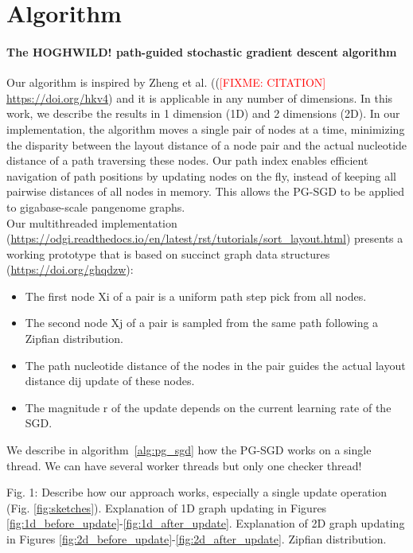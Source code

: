 \documentclass{bioinfo}
\theoremstyle{definition}
\newcommand{\red}[1]{{\textcolor{Red}{#1}}}
\newcommand{\FIXME}[1]{\red{[FIXME: #1]}}
\begin{document}
    \section{Algorithm}

    \paragraph{The HOGHWILD! path-guided stochastic gradient descent algorithm}
    Our algorithm is inspired by Zheng et al. ((\FIXME{CITATION} \url{https://doi.org/hkv4}) and it is applicable in any number of dimensions.
    In this work, we describe the results in 1 dimension (1D) and 2 dimensions (2D).
    In our implementation, the algorithm moves a single pair of nodes at a time, minimizing the disparity between the layout distance of a node pair and the actual nucleotide distance of a path traversing these nodes.
    Our path index enables efficient navigation of path positions by updating nodes on the fly, instead of keeping all pairwise distances of all nodes in memory.
    This allows the PG-SGD to be applied to gigabase-scale pangenome graphs. \\
    Our multithreaded implementation (\url{https://odgi.readthedocs.io/en/latest/rst/tutorials/sort_layout.html}) presents a working prototype that is based on succinct graph data structures (\url{https://doi.org/ghqdzw}):
    \begin{itemize}
        \item The first node Xi of a pair is a uniform path step pick from all nodes.
        \item The second node Xj of a pair is sampled from the same path following a Zipfian distribution.
        \item The path nucleotide distance of the nodes in the pair guides the actual layout distance dij update of these nodes.
        \item The magnitude r of the update depends on the current learning rate of the SGD.
    \end{itemize}
    We describe in algorithm~\ref{alg:pg_sgd} how the PG-SGD works on a single thread.
    We can have several worker threads but only one checker thread!

    

    \iffalse
    Fig. 1: Describe how our approach works, especially a single update operation (Fig. \ref{fig:sketches}). Explanation of 1D graph updating in Figures \ref{fig:1d_before_update}-\ref{fig:1d_after_update}. Explanation of 2D graph updating in Figures \ref{fig:2d_before_update}-\ref{fig:2d_after_update}. Zipfian distribution.
\end{document}
